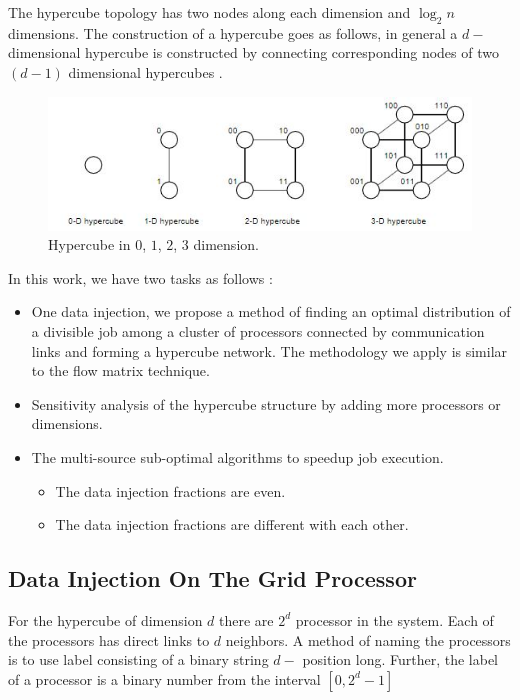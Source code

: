 The hypercube topology has two nodes along each dimension and $\log_2 n$ dimensions.  The construction of a hypercube goes as follows, in general a $d-$dimensional hypercube is constructed by connecting corresponding nodes of two $(d-1)$ dimensional hypercubes .\\

\begin{figure}[!ht]
\centering
\includegraphics[width=1\columnwidth]{figure/hypercube_basic.JPG}
\caption{Hypercube in $0$, $1$, $2$, $3$ dimension. \cite{Informatik5}}
\label{fig:hypercube_basic}
\end{figure}

In this work, we have two tasks as follows :
\begin{itemize}
\item One data injection, we propose a method of finding an optimal distribution of a divisible job among a cluster of processors connected by communication links and forming a hypercube network.  The methodology we apply is similar to the flow matrix technique.\\
\item Sensitivity analysis of the hypercube structure by adding more processors or dimensions.
\item The multi-source sub-optimal algorithms to speedup job execution.
\begin{itemize}
\item The data injection fractions are even.
\item The data injection fractions are different with each other.
\end{itemize}
\end{itemize}

\subsection{Data Injection On The Grid Processor}
For the hypercube of dimension $d$ there are $2^{d}$ processor in the system.  Each of the processors has direct links to $d$ neighbors.  A method of naming the processors is to use label consisting of a binary string $d-$ position long.  Further, the label of a processor is a binary number from the interval $[0, 2^{d}-1]$

